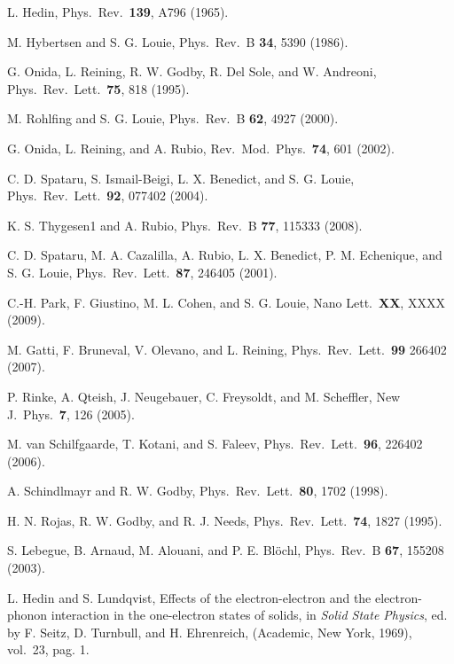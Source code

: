 \documentclass[twocolumn,prb,showpacs,superscriptaddress]{revtex4}
\begin{document}
\begin{thebibliography}{99}

L. Hedin,
Phys.\ Rev.\ {\bf 139}, A796 (1965).

M. Hybertsen and S. G. Louie,
Phys.\ Rev.\ B {\bf 34}, 5390 (1986).

G. Onida, L. Reining, R. W. Godby, R. Del Sole, and W. Andreoni, 
Phys.\ Rev.\ Lett.\ {\bf 75}, 818 (1995).

M. Rohlfing and S. G. Louie,
Phys.\ Rev.\ B {\bf 62}, 4927 (2000).

G. Onida, L. Reining, and A. Rubio,
Rev.\ Mod.\ Phys.\ {\bf 74}, 601 (2002).

C. D. Spataru, S. Ismail-Beigi, L. X. Benedict, and S. G. Louie,
Phys.\ Rev.\ Lett.\ {\bf 92}, 077402 (2004).

K. S. Thygesen1 and A. Rubio,
Phys.\ Rev.\ B {\bf 77}, 115333 (2008).

C. D. Spataru, M. A. Cazalilla, A. Rubio, L. X. Benedict, P. M. Echenique, and S. G. Louie,
Phys.\ Rev.\ Lett.\ {\bf 87}, 246405 (2001).

C.-H. Park, F. Giustino, M. L. Cohen, and S. G. Louie,
Nano Lett.\ {\bf XX}, XXXX (2009).

M. Gatti, F. Bruneval, V. Olevano, and L. Reining,
Phys.\ Rev.\ Lett.\ {\bf 99} 266402 (2007).

P. Rinke, A. Qteish, J. Neugebauer, C. Freysoldt, and M. Scheffler, 
New J.\ Phys.\ {\bf 7}, 126 (2005). 

M. van Schilfgaarde, T. Kotani, and S. Faleev,
Phys.\ Rev.\ Lett.\ {\bf 96}, 226402 (2006).

A. Schindlmayr and R. W. Godby,
Phys.\ Rev.\ Lett.\ {\bf 80}, 1702 (1998).

H. N. Rojas, R. W. Godby, and R. J. Needs,
Phys.\ Rev.\ Lett.\ {\bf 74}, 1827 (1995).

S. Lebegue, B. Arnaud, M. Alouani, and P. E. Bl\"ochl,
Phys.\ Rev.\ B {\bf 67}, 155208 (2003). 

L. Hedin and S. Lundqvist,
Effects of the electron-electron and the electron-phonon interaction in
the one-electron states of solids,
in {\it Solid State Physics}, ed. by F. Seitz, D. Turnbull, and
H. Ehrenreich, (Academic, New York, 1969), vol.\ 23, pag. 1.


\end{thebibliography}
\end{document}
